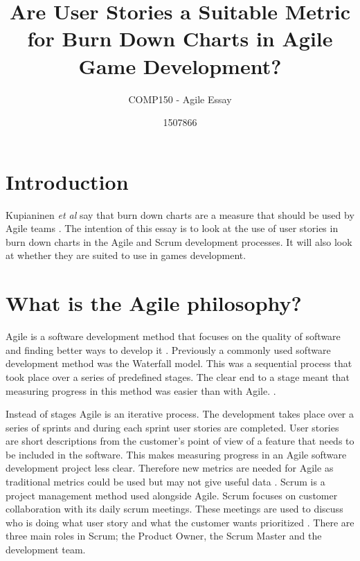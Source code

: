 \documentclass{scrartcl}
\title{Are User Stories a Suitable Metric for Burn Down Charts in Agile Game Development?}
\subtitle{COMP150 - Agile Essay}
\author{1507866}
\begin{document}
	
\maketitle
	
	
\section{Introduction}

Kupianinen \textit{et al} say that burn down charts are a measure that should be used by Agile teams \cite{Kupiainen}. The intention of this essay is to look at the use of user stories in burn down charts in the Agile and Scrum development processes. It will also look at whether they are suited to use in games development.

\section{What is the Agile philosophy?}

Agile is a software development method that focuses on the quality of software and finding better ways to develop it \cite{AgileManifesto}. Previously a commonly used software development method was the Waterfall model. This was a sequential process that took place over a series of predefined stages. The clear end to a stage meant that measuring progress in this method was easier than with Agile. \cite{Duka}.

Instead of stages Agile is an iterative process. The development takes place over a series of sprints and during each sprint user stories are completed. User stories are short descriptions from the customer's point of view of a feature that needs to be included in the software. This makes measuring progress in an Agile software development project less clear. Therefore new metrics are needed for Agile as traditional metrics could be used but may not give useful data \cite{Misra}.
Scrum is a project management method used alongside Agile. Scrum focuses on customer collaboration with its daily scrum meetings. These meetings are used to discuss who is doing what user story and what the customer wants prioritized \cite{Sutherland}. There are three main roles in Scrum; the Product Owner, the Scrum Master and the development team. \cite{Ktata}
\end{document}

